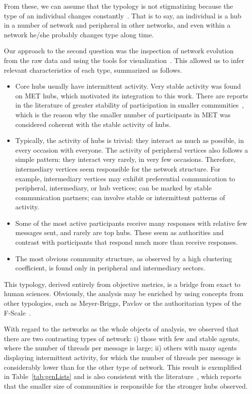 \documentclass[%
 aip,
 jmp,%
 amsmath,amssymb,
 reprint,%
]{revtex4-1}
\begin{document}
From these, we can assume that the typology is not stigmatizing because the type of an individual changes constantly~\cite{adorno}. That is to say, an individual is a hub in a number of network and peripheral in other networks, and even within a network he/she probably changes type along time.

Our approach to the second question was the inspection of network evolution from the raw data and using the tools for visualization~\cite{rcText,versinus}. This allowed us to infer relevant characteristics of each type, summarized as follows.

\begin{itemize}
    \item Core hubs usually have intermittent activity. Very stable activity was found on MET hubs, which motivated its integration to this work. There are reports in the literature of greater stability of participation in smaller communities~\cite{barabasiEvo}, which is the reason why the smaller number of participants in MET was considered coherent with the stable activity of hubs.
    \item Typically, the activity of hubs is trivial: they interact as much as possible, in every occasion with everyone. The activity of peripheral vertices also follows a simple pattern: they interact very rarely, in very few occasions. Therefore, intermediary vertices seem responsible for the network structure. For example, intermediary vertices may exhibit preferential communication to peripheral, intermediary, or hub vertices; can be marked by stable communication partners; can involve stable or intermittent patterns of activity.
    \item Some of the most active participants receive many responses with relative few messages sent, and rarely are top hubs. These seem as authorities and contrast with participants that respond much more than receive responses.
    \item The most obvious community structure, as observed by a high clustering coefficient, is found only in peripheral and intermediary sectors.
\end{itemize}

This typology, derived entirely from objective metrics, is a bridge from exact to human sciences. Obviously, the analysis may be enriched by using concepts from other typologies, such as Meyer-Briggs, Pavlov or the authoritarian types of the F-Scale~\cite{adorno}.

With regard to the networks as the whole objects of analysis, we observed that there are two contrasting types of network: i) those with few and stable agents, where the number of threads per message is large; ii) others with many agents displaying intermittent activity, for which the number of threads per message is considerably lower than for the other type of network. This result is exemplified in Table~\ref{tab:genLists} and is also consistent with the literature~\cite{barabasiEvo}, which reports that the smaller size of communities is responsible for the stronger hubs observed.
 
\end{document}
